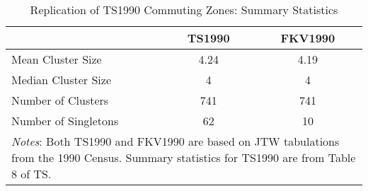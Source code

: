 
\begin{table}\centering
\caption{Replication of TS1990 Commuting Zones: Summary Statistics \label{tab:replication}}
\begin{tabular}{lcc}
\hline\hline
       & TS1990 &  FKV1990  \\
       \hline
Mean Cluster Size &  4.24  & 4.19 \\
Median Cluster Size & 4 & 4 \\
Number of Clusters & 741 & 741  \\
Number of Singletons & 62 &  10 \\
\hline
\multicolumn{3}{p{4in}}{\footnotesize \textit{Notes}: Both TS1990 and FKV1990 are based on JTW tabulations from the 1990 Census. Summary statistics for TS1990 are from Table 8 of TS.}\\
\end{tabular}
\end{table}

